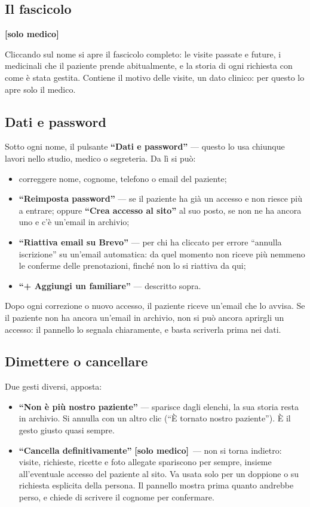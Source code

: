 \documentclass[11pt,a4paper]{article}
\newcommand{\bottone}[1]{\textbf{``#1''}}
\newcommand{\solomedico}{\textcolor{studioarancio}{\textbf{[solo medico]}}\ }
\begin{document}
\subsection{Il fascicolo} \solomedico

Cliccando sul nome si apre il fascicolo completo: le visite passate e future, i medicinali che il paziente prende abitualmente, e la storia di ogni richiesta con come è stata gestita. Contiene il motivo delle visite, un dato clinico: per questo lo apre solo il medico.

\subsection{Dati e password}

Sotto ogni nome, il pulsante \bottone{Dati e password} --- questo lo usa chiunque lavori nello studio, medico o segreteria. Da lì si può:

\begin{itemize}
  \item correggere nome, cognome, telefono o email del paziente;
  \item \bottone{Reimposta password} --- se il paziente ha già un accesso e non riesce più a entrare; oppure \bottone{Crea accesso al sito} al suo posto, se non ne ha ancora uno e c'è un'email in archivio;
  \item \bottone{Riattiva email su Brevo} --- per chi ha cliccato per errore ``annulla iscrizione'' su un'email automatica: da quel momento non riceve più nemmeno le conferme delle prenotazioni, finché non lo si riattiva da qui;
  \item \bottone{+ Aggiungi un familiare} --- descritto sopra.
\end{itemize}

Dopo ogni correzione o nuovo accesso, il paziente riceve un'email che lo avvisa. Se il paziente non ha ancora un'email in archivio, non si può ancora aprirgli un accesso: il pannello lo segnala chiaramente, e basta scriverla prima nei dati.

\subsection{Dimettere o cancellare}

Due gesti diversi, apposta:

\begin{itemize}
  \item \bottone{Non è più nostro paziente} --- sparisce dagli elenchi, la sua storia resta in archivio. Si annulla con un altro clic (``È tornato nostro paziente''). È il gesto giusto quasi sempre.
  \item \bottone{Cancella definitivamente} \solomedico --- non si torna indietro: visite, richieste, ricette e foto allegate spariscono per sempre, insieme all'eventuale accesso del paziente al sito. Va usata solo per un doppione o su richiesta esplicita della persona. Il pannello mostra prima quanto andrebbe perso, e chiede di scrivere il cognome per confermare.
\end{itemize}
\end{document}
